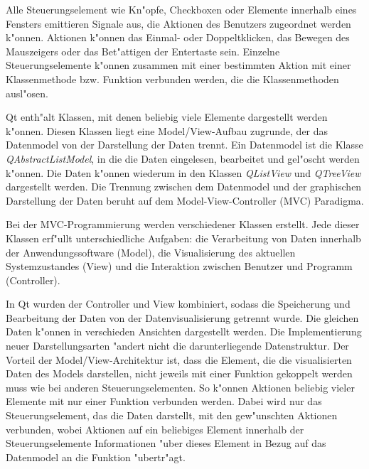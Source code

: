 Alle Steuerungselement wie Kn"opfe, Checkboxen oder Elemente innerhalb eines Fensters emittieren Signale aus, die Aktionen des Benutzers
zugeordnet werden k"onnen. Aktionen k"onnen das Einmal- oder Doppeltklicken, das Bewegen des Mauszeigers oder das Bet"attigen der Entertaste sein.
Einzelne Steuerungselemente k"onnen zusammen mit einer bestimmten Aktion mit einer Klassenmethode bzw. Funktion verbunden werden, die die Klassenmethoden ausl"osen. 
  

Qt enth"alt Klassen, mit denen beliebig viele Elemente dargestellt werden k"onnen. Diesen Klassen liegt eine Model/View-Aufbau zugrunde,
 der das Datenmodel von der Darstellung der Daten trennt. 
Ein Datenmodel ist die Klasse \textit{QAbstractListModel}, in die die Daten eingelesen, bearbeitet und gel"oscht werden k"onnen.
Die Daten k"onnen wiederum in den Klassen \textit{QListView} und \textit{QTreeView} dargestellt werden. 
Die Trennung zwischen dem Datenmodel und der graphischen Darstellung der Daten beruht auf dem Model-View-Controller (MVC) Paradigma.\cite{Qt}  

Bei der MVC-Programmierung werden verschiedener Klassen erstellt. Jede dieser Klassen erf"ullt unterschiedliche Aufgaben:
die Verarbeitung von Daten innerhalb der
Anwendungssoftware (Model), die Visualisierung des aktuellen Systemzustandes (View) und die Interaktion zwischen Benutzer und Programm (Controller). \cite{MVC}

In Qt wurden der Controller und View kombiniert, sodass die Speicherung und Bearbeitung der Daten  von der Datenvisualisierung  
getrennt wurde. Die gleichen Daten k"onnen in verschieden Ansichten dargestellt werden. 
Die Implementierung neuer Darstellungsarten "andert nicht die darunterliegende Datenstruktur.\cite{Qt} 
Der Vorteil der Model/View-Architektur ist, dass die Element, die die visualisierten Daten des Models darstellen, nicht jeweils mit einer
Funktion gekoppelt werden muss wie bei anderen Steuerungselementen. So k"onnen Aktionen beliebig vieler Elemente 
mit nur einer Funktion verbunden werden. Dabei wird nur das Steuerungselement, das die Daten darstellt, mit den gew"unschten
Aktionen verbunden, wobei Aktionen auf ein beliebiges Element innerhalb der Steuerungselemente Informationen "uber dieses Element 
in Bezug auf das Datenmodel an die Funktion "ubertr"agt.

